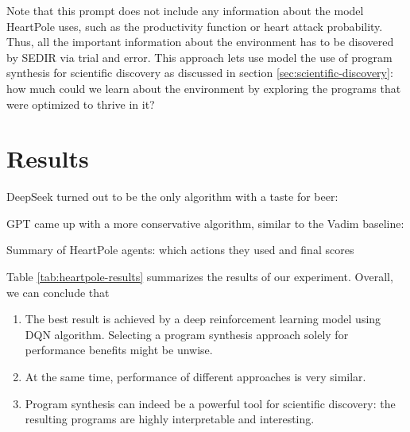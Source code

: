 

Note that this prompt does not include any information about the model HeartPole uses, such as the productivity function or heart attack probability.
Thus, all the important information about the environment has to be disovered by SEDIR via trial and error.
This approach lets use model the use of program synthesis for scientific discovery as discussed in section \ref{sec:scientific-discovery}: how much could we learn about the environment by exploring the programs that were optimized to thrive in it?

\newpage
\section{Results}

DeepSeek turned out to be the only algorithm with a taste for beer:



GPT came up with a more conservative algorithm, similar to the Vadim baseline:



\begin{table}[]
    \centering
    
    \caption{Summary of HeartPole agents: which actions they used and final scores}
    \label{tab:heartpole-results}
\end{table}


Table \ref{tab:heartpole-results} summarizes the results of our experiment. Overall, we can conclude that

\begin{enumerate}
    \item The best result is achieved by a deep reinforcement learning model using DQN algorithm.
    Selecting a program synthesis approach solely for performance benefits might be unwise.
    \item At the same time, performance of different approaches is very similar.
    \item Program synthesis can indeed be a powerful tool for scientific discovery: the resulting programs are highly interpretable and interesting.
\end{enumerate}
